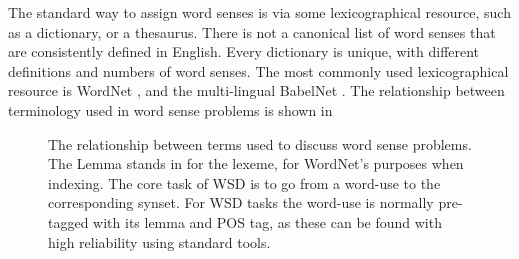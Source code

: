 \documentclass[12pt,parskip]{komatufte}
\begin{document}
The standard way to assign word senses is via some lexicographical resource, such as a dictionary, or a thesaurus.
There is not a canonical list of word senses that are consistently defined in English.
Every dictionary is unique, with different definitions and numbers of word senses.
The most commonly used lexicographical resource is WordNet , and the multi-lingual  BabelNet .
The relationship between terminology used in word sense problems is shown in 


\begin{figure}
	\caption{The relationship between terms used to discuss word sense problems.
		The Lemma stands in for the lexeme, for WordNet's purposes when indexing.
		The core task of WSD is to go from a word-use to the corresponding synset.
		For WSD tasks the word-use is normally pre-tagged with its lemma and POS tag,
		as these can be found with high reliability using standard tools.
	}
	\label{fig:wordsenseterms}

	
	
\end{figure}
\end{document}
